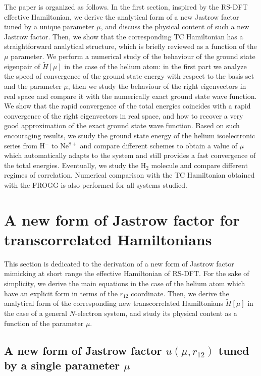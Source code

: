 \documentclass[aip,jcp,reprint,noshowkeys,superscriptaddress,twocolumn]{revtex4-1}
\begin{document}
The paper is organized as follows. 
In the first section, inspired by the RS-DFT effective Hamiltonian,  
we derive the analytical form of a new Jastrow factor tuned by a unique parameter $\mu$, and discuss the physical content of such a new Jastrow factor. 
Then, we show that the corresponding TC Hamiltonian has a straightforward analytical structure, which is briefly reviewed as a function of the $\mu$ parameter. 
We perform a numerical study of the behaviour of the ground state eigenpair of $\tilde{H}[\mu]$ in the case of the helium atom: 
in the first part we analyze the speed of convergence of the ground state energy with respect to the basis set and the parameter $\mu$, 
then we study the behaviour of the right eigenvectors in real space and compare it with the numerically exact ground state wave function. 
We show that the rapid convergence of the total energies coincides with a rapid convergence of the right eigenvectors in real space, and how to recover a very good approximation of the exact ground state wave function. 
Based on such encouraging results, we study the ground state energy of the helium isoelectronic series from H$^-$ to Ne$^{8+}$ and compare different schemes to obtain 
a value of $\mu$ which automatically adapts to the system and still provides a fast convergence of the total energies. 
Eventually, we study the H$_2$ molecule and compare different regimes of correlation. 
Numerical comparison with the TC Hamiltonian obtained with the FROGG is also performed for all systems studied.  

\section{A new form of Jastrow factor for transcorrelated Hamiltonians}
This section is dedicated to the derivation of a new form of Jastrow factor mimicking at short range the effective Hamiltonian of RS-DFT. 
For the sake of simplicity, we derive the main equations in the case of the helium atom which have an explicit form in terms of the $r_{12}$ coordinate. 
Then, we derive the analytical form of the corresponding new transcorrelated Hamiltonians $\tilde{H}[\mu]$ in the case of a general $N$-electron system, and study its physical content as a  function of the parameter $\mu$. 

\subsection{A new form of Jastrow factor $u(\mu,r_{12})$ tuned by a single parameter $\mu$}
\label{sec:new_j}
\end{document}
